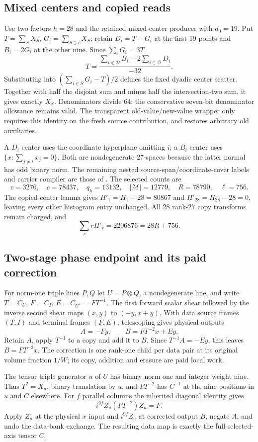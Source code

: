 \subsection{Mixed centers and copied reads}
Use two factors $h=28$ and the retained mixed-center producer with
$d_0=19$. Put $T=\sum_SX_S$, $G_i=\sum_{S\ni i}X_S$;
retain $D_i=T-G_i$ at the first 19 points and $B_i=2G_i$ at the other
nine. Since $\sum_iG_i=3T$,
\[
 T=\frac{\sum_{i\notin\mathcal D}B_i-2\sum_{i\in\mathcal D}D_i}{-32}.
\]
Substituting into $(\sum_{i\in S}G_i-T)/2$ defines the fixed dyadic
center scatter. Together with half the disjoint sum and minus half the
intersection-two sum, it gives exactly $X_S$. Denominators divide 64;
the conservative seven-bit denominator allowance remains valid.
The transparent old-value/new-value wrapper only requires this identity
on the fresh source contribution, and restores arbitrary old auxiliaries.

A $D_i$ center uses the coordinate hyperplane omitting $i$; a $B_i$
center uses $\{x:\sum_{j\ne i}x_j=0\}$. Both are nondegenerate
27-spaces because the latter normal has odd binary norm. The remaining
nested source-span/coordinate-cover labels and carrier compiler are
those of . The selected counts are
\[
 v=3276,\quad c=78437,\quad q_h=13132,\quad
 |\mathcal M|=12779,\quad R=78790,\quad\ell=756.
\]
The copied-center lemma gives $H'_1=H_1+28=80867$ and
$H'_{28}=H_{28}-28=0$, leaving every other histogram entry unchanged.
All 28 rank-27 copy transforms remain charged, and
\[
 \sum_r rH'_r=2206876=28R+756.
\]

\subsection{Two-stage phase endpoint and its paid correction}
For norm-one triple lines $P,Q$ let $U=P\otimes Q$, a nondegenerate
line, and write $T=C_U$, $F=C_I$, $E=C_{U^\perp}=FT^{-1}$.
The first forward scalar shear followed by the inverse second shear
maps $(x,y)$ to $(-y,x+y)$. With data source frames $(T,I)$ and
terminal frames $(F,E)$, telescoping gives physical outputs
\[
 A=-Fy,\qquad B=FT^{-2}x+Ey.
\]
Retain $A$, apply $T^{-1}$ to a copy and add it to $B$.
Since $T^{-1}A=-Ey$, this leaves $B=FT^{-2}x$. The correction is one
rank-one child per data pair at its original volume fraction $1/W$;
its copy, addition and erasure are paid local work.

The tensor triple generator $u$ of $U$ has binary norm one and integer
weight nine. Thus $T^2=X_u$, binary translation by $u$, and $FT^{-2}$
has $C^{-1}$ at the nine positions in $u$ and $C$ elsewhere.
For $f$ parallel columns the inherited diagonal identity gives
\[
 i^{9f}Z_u(FT^{-2})Z_u=F.
\]
Apply $Z_u$ at the physical $x$ input and $i^{9f}Z_u$ at corrected
output $B$, negate $A$, and undo the data-bank exchange. The resulting
data map is exactly the full selected-axis tensor $C$.

